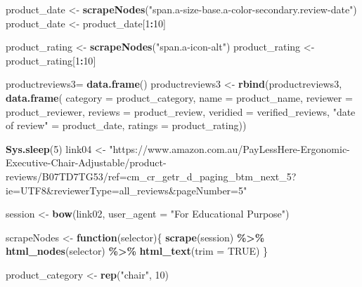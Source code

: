 \documentclass[
]{article}
\newenvironment{Shaded}{\begin{snugshade}}{\end{snugshade}}
\newcommand{\AttributeTok}[1]{\textcolor[rgb]{0.13,0.29,0.53}{#1}}
\newcommand{\ConstantTok}[1]{\textcolor[rgb]{0.56,0.35,0.01}{#1}}
\newcommand{\ControlFlowTok}[1]{\textcolor[rgb]{0.13,0.29,0.53}{\textbf{#1}}}
\newcommand{\DecValTok}[1]{\textcolor[rgb]{0.00,0.00,0.81}{#1}}
\newcommand{\FunctionTok}[1]{\textcolor[rgb]{0.13,0.29,0.53}{\textbf{#1}}}
\newcommand{\NormalTok}[1]{#1}
\newcommand{\OtherTok}[1]{\textcolor[rgb]{0.56,0.35,0.01}{#1}}
\newcommand{\SpecialCharTok}[1]{\textcolor[rgb]{0.81,0.36,0.00}{\textbf{#1}}}
\newcommand{\StringTok}[1]{\textcolor[rgb]{0.31,0.60,0.02}{#1}}
\begin{document}
\begin{Shaded}
\begin{Highlighting}[]
\NormalTok{  product\_date }\OtherTok{\textless{}{-}} \FunctionTok{scrapeNodes}\NormalTok{(}\StringTok{"span.a{-}size{-}base.a{-}color{-}secondary.review{-}date"}\NormalTok{)}
\NormalTok{  product\_date }\OtherTok{\textless{}{-}}\NormalTok{ product\_date[}\DecValTok{1}\SpecialCharTok{:}\DecValTok{10}\NormalTok{]}
  
\NormalTok{  product\_rating }\OtherTok{\textless{}{-}} \FunctionTok{scrapeNodes}\NormalTok{(}\StringTok{"span.a{-}icon{-}alt"}\NormalTok{)}
\NormalTok{  product\_rating }\OtherTok{\textless{}{-}}\NormalTok{ product\_rating[}\DecValTok{1}\SpecialCharTok{:}\DecValTok{10}\NormalTok{]}
  
\NormalTok{  productreviews3}\OtherTok{=} \FunctionTok{data.frame}\NormalTok{()}
\NormalTok{  productreviews3 }\OtherTok{\textless{}{-}} \FunctionTok{rbind}\NormalTok{(productreviews3, }\FunctionTok{data.frame}\NormalTok{(}
                      \AttributeTok{category =}\NormalTok{ product\_category,}
                      \AttributeTok{name =}\NormalTok{ product\_name,}
                      \AttributeTok{reviewer =}\NormalTok{ product\_reviewer,}
                      \AttributeTok{reviews =}\NormalTok{ product\_review,}
                      \AttributeTok{veridied =}\NormalTok{ verified\_reviews,}
                      \StringTok{"date of review"} \OtherTok{=}\NormalTok{ product\_date,}
                      \AttributeTok{ratings =}\NormalTok{ product\_rating))}
  
   \FunctionTok{Sys.sleep}\NormalTok{(}\DecValTok{5}\NormalTok{)}
\NormalTok{link04 }\OtherTok{\textless{}{-}} \StringTok{"https://www.amazon.com.au/PayLessHere{-}Ergonomic{-}Executive{-}Chair{-}Adjustable/product{-}reviews/B07TD7TG53/ref=cm\_cr\_getr\_d\_paging\_btm\_next\_5?ie=UTF8\&reviewerType=all\_reviews\&pageNumber=5"}


\NormalTok{  session }\OtherTok{\textless{}{-}} \FunctionTok{bow}\NormalTok{(link02,}
               \AttributeTok{user\_agent =} \StringTok{"For Educational Purpose"}\NormalTok{)}

\NormalTok{  scrapeNodes }\OtherTok{\textless{}{-}} \ControlFlowTok{function}\NormalTok{(selector)\{}
    \FunctionTok{scrape}\NormalTok{(session) }\SpecialCharTok{\%\textgreater{}\%}
      \FunctionTok{html\_nodes}\NormalTok{(selector) }\SpecialCharTok{\%\textgreater{}\%}
      \FunctionTok{html\_text}\NormalTok{(}\AttributeTok{trim =} \ConstantTok{TRUE}\NormalTok{)}
\NormalTok{  \}}

\NormalTok{  product\_category }\OtherTok{\textless{}{-}} \FunctionTok{rep}\NormalTok{(}\StringTok{"chair"}\NormalTok{, }\DecValTok{10}\NormalTok{)}


\end{Highlighting}
\end{Shaded}
\end{document}
